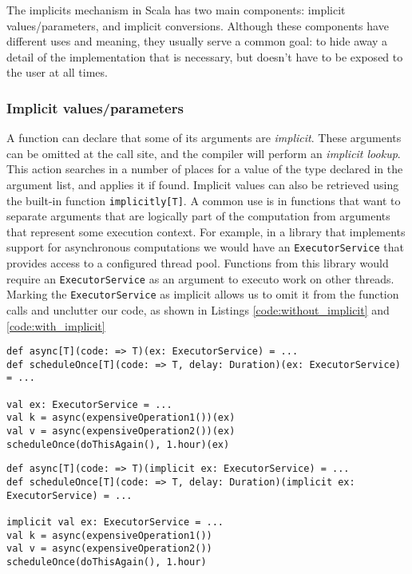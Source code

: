 The implicits mechanism in Scala has two main components: implicit values/parameters, and implicit conversions.
Although these components have different uses and meaning, they usually serve a common goal: to hide away a detail of the implementation that is necessary, but doesn't have to be exposed to the user at all times.

\subsubsection{Implicit values/parameters}

A function can declare that some of its arguments are {\it implicit}.
These arguments can be omitted at the call site, and the compiler will perform an {\it implicit lookup}.
This action searches in a number of places for a value of the type declared in the argument list, and applies it if found.
Implicit values can also be retrieved using the built-in function \texttt{implicitly[T]}.
A common use is in functions that want to separate arguments that are logically part of the computation from arguments that represent some execution context.
For example, in a library that implements support for asynchronous computations we would have an \texttt{ExecutorService} that provides access to a configured thread pool.
Functions from this library would require an \texttt{ExecutorService} as an argument to executo work on other threads.
Marking the \texttt{ExecutorService} as implicit allows us to omit it from the function calls and unclutter our code, as shown in Listings \ref{code:without_implicit} and \ref{code:with_implicit}

\begin{lstlisting}[caption=Code without implicits, label=code:without_implicit]
def async[T](code: => T)(ex: ExecutorService) = ...
def scheduleOnce[T](code: => T, delay: Duration)(ex: ExecutorService) = ...

val ex: ExecutorService = ...
val k = async(expensiveOperation1())(ex)
val v = async(expensiveOperation2())(ex)
scheduleOnce(doThisAgain(), 1.hour)(ex)
\end{lstlisting}

\begin{lstlisting}[caption=Code with implicits, label=code:with_implicit]
def async[T](code: => T)(implicit ex: ExecutorService) = ...
def scheduleOnce[T](code: => T, delay: Duration)(implicit ex: ExecutorService) = ...

implicit val ex: ExecutorService = ...
val k = async(expensiveOperation1())
val v = async(expensiveOperation2())
scheduleOnce(doThisAgain(), 1.hour)
\end{lstlisting}

